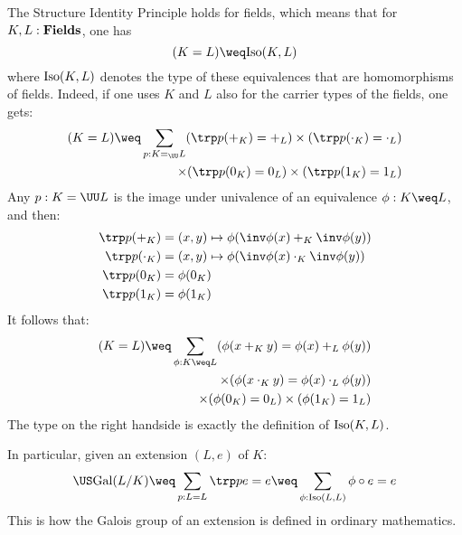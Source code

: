 \begin{remark}
  \label{rem:sip-univalence}
  The Structure Identity Principle holds for fields, which means that for
  $K,L:\mathbf{Fields}$, one has
  \begin{displaymath}
    (K = L) \weq \iso(K,L)
  \end{displaymath}
  where $\mathrm{Iso}(K,L)$ denotes the type of these equivalences that are
  homomorphisms of fields. Indeed, if one uses $K$ and $L$ also for the carrier
  types of the fields, one gets:
  \begin{displaymath}
    \begin{split}
      (K = L) \weq \sum_{p:K=_\UU L}  (\trp p (+_K) = +_L)
      \times (\trp p (\cdot_K) = \cdot_L)
      \\ \times (\trp p (0_K) = 0_L)
      \times (\trp p (1_K) = 1_L) 
    \end{split}
  \end{displaymath}
  Any $p : K =\UU L$ is the image under univalence of an equivalence $\phi: K \weq L$, and then:
  \begin{align*}
    \trp p (+_K) &= (x,y) \mapsto \phi( \inv\phi(x) +_K \inv \phi(y)) \\
    \trp p (\cdot_K) &= (x,y) \mapsto \phi( \inv\phi(x) \cdot_K \inv \phi(y)) \\
    \trp p (0_K) &=\phi( 0_K ) \\
    \trp p (1_K) &=\phi( 1_K )
  \end{align*}
  It follows that:
  \begin{displaymath}
    \begin{split}
      (K=L) \weq \sum_{\phi: K \weq L} (\phi(x +_K y) = \phi (x) +_L \phi (y)) \\
      \times (\phi(x\cdot_K y) = \phi (x) \cdot_L \phi (y)) \\
      \times (\phi(0_K) = 0_L)
        \times (\phi(1_K) = 1_L)
    \end{split}
  \end{displaymath}
  The type on the right handside is exactly the definition of $\mathrm{Iso}(K,L)$.

  In particular, given an extension $(L,e)$ of $K$:
  \begin{align*}
    \US \Gal(L/K) \weq \sum_{p:L=L} \trp p e = e \weq \sum_{\phi:\iso(L,L)} \phi \circ e = e
  \end{align*}
  This is how the Galois group of an extension is defined in ordinary mathematics.
\end{remark}

